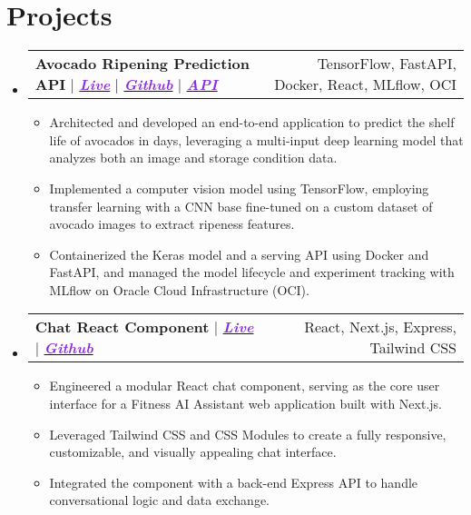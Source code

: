 \documentclass[a4paper,11pt]{article}
\makeatletter
\newcommand{\resumeItem}[1]{
  \item\small{
    {#1 \vspace{-2pt}}
  }
}
\newcommand{\resumeProjectHeading}[2]{
    \item
    \begin{tabular*}{1\textwidth}{l@{\extracolsep{\fill}}r}
      \small#1 & #2 \\
    \end{tabular*}\vspace{-7pt}
}
\newcommand{\resumeSubHeadingListStart}{\begin{itemize}[leftmargin=0in, label={}]}
\newcommand{\resumeSubHeadingListEnd}{\end{itemize}}
\newcommand{\resumeItemListStart}{\begin{itemize}[leftmargin=0.15in, nosep]}
\newcommand{\resumeItemListEnd}{\end{itemize}\vspace{-2pt}}
\makeatother
\begin{document}
\section{\Large{Projects}}
\resumeSubHeadingListStart
\resumeProjectHeading
{\textbf{\large{Avocado Ripening Prediction API}} $|$ \emph{\href{https://avocado-ripening-ui.vercel.app/}{\textcolor{BlueViolet}{\textbf{Live}}}} $|$ \emph{\href{https://github.com/lepcodes/avocado-ripening.git}{\textcolor{BlueViolet}{\textbf{Github}}}} $|$ \emph{\href{http://220.158.72.163:8080/docs}{\textcolor{BlueViolet}{\textbf{API}}}}}
{TensorFlow, FastAPI, Docker, React, MLflow, OCI}
\resumeItemListStart
\resumeItem{Architected and developed an end-to-end application to predict the shelf life of avocados in days, leveraging a multi-input deep learning model that analyzes both an image and storage condition data.}
\resumeItem{Implemented a computer vision model using TensorFlow, employing transfer learning with a CNN base fine-tuned on a custom dataset of avocado images to extract ripeness features.}
\resumeItem{Containerized the Keras model and a serving API using Docker and FastAPI, and managed the model lifecycle and experiment tracking with MLflow on Oracle Cloud Infrastructure (OCI).}
\resumeItemListEnd
\resumeProjectHeading
{\textbf{\large{Chat React Component}} $|$ \emph{\href{https://lep-chat-demo.vercel.app/}{\textcolor{BlueViolet}{\textbf{Live}}}} $|$ \emph{\href{https://github.com/lepcodes/lep-chat}{\textcolor{BlueViolet}{\textbf{Github}}}}}{React, Next.js, Express, Tailwind CSS}
\resumeItemListStart
\resumeItem{Engineered a modular React chat component, serving as the core user interface for a Fitness AI Assistant web application built with Next.js.}
\resumeItem{Leveraged Tailwind CSS and CSS Modules to create a fully responsive, customizable, and visually appealing chat interface.}
\resumeItem{Integrated the component with a back-end Express API to handle conversational logic and data exchange.}
\resumeItemListEnd
\resumeSubHeadingListEnd
\end{document}

